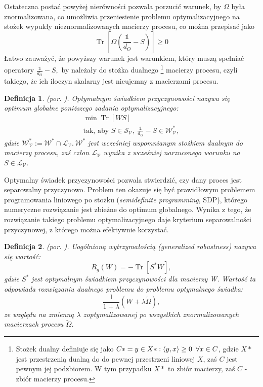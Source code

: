 \documentclass[10pt]{article} %
\newtheorem{definicja}{Definicja}
\DeclareMathOperator{\Trs}{Tr}
\newcommand{\I}{\mathbb{1}}
\begin{document}
Ostateczna postać powyżej nierówności pozwala porzucić warunek, by $\Omega$ była znormalizowana, co umożliwia przeniesienie problemu optymalizacyjnego na stożek wypukły nieznormalizowanych macierzy procesu, co można przepisać jako 
\begin{equation}
\Trs \left[ \Omega(\frac{\I}{d_O} -S) \right] \geq 0
\end{equation}
Łatwo zauważyć, że powyższy warunek jest warunkiem, który muszą spełniać operatory $\frac{\I}{d_O} - S,$ by należały do stożka dualnego
\footnote{
Stożek dualny definiuje się jako $C* = {y \in X*: \langle y, x \rangle \geq 0 \enskip \forall x \in C}$, gdzie $X*$ jest przestrzenią dualną do do pewnej przestrzeni liniowej $X$, zaś $C$ jest pewnym jej podzbiorem. W tym przypadku $X*$ to zbiór macierzy, zaś $C$ - zbiór macierzy procesu.
}
 macierzy procesu, czyli takiego, że ich iloczyn skalarny jest nieujemny z macierzami procesu.
\begin{definicja}
(por. \cite{causal_witness}).
Optymalnym świadkiem przyczynowości nazywa się optimum globalne poniższego zadania optymalizacyjnego:
\begin{gather}
\min \Trs \left[ WS \right]\\
\text{tak, aby } S \in \mathcal{S_V},~ \frac{\I}{d_O} - S \in \mathcal{W^*_V},
\end{gather}
gdzie $\mathcal{W^*_V}:=\mathcal{W^*} \cap \mathcal{L_V}.~ \mathcal{W^*}$ jest wcześniej wspomnianym stożkiem dualnym do macierzy procesu,
zaś człon $\mathcal{L_V}$ wynika z wcześniej narzuconego warunku na $S \in \mathcal{L_V}$. 
\end{definicja}
Optymalny świadek przyczynowości pozwala stwierdzić, czy dany proces jest separowalny przyczynowo.
Problem ten okazuje się być prawidłowym problemem
programowania liniowego po stożku (\textit{semidefinite programming}, SDP), którego numeryczne rozwiązanie jest zbieżne do optimum globalnego.
Wynika z tego, że rozwiązanie takiego problemu optymalizacyjnego daje kryterium separowalności przyczynowej, z którego można efektywnie korzystać.
\begin{definicja}
(por. \cite{causal_witness}).
Uogólnioną wytrzymałością (\textit{generalized robustness}) nazywa się wartość:
\begin{equation}
R_g(W) = -\Trs\left[ S^*W\right],
\end{equation} gdzie $S^*$ jest optymalnym świadkiem przyczynowości dla macierzy W. Wartość ta odpowiada rozwiązaniu dualnego problemu do problemu optymalnego świadka:
\begin{equation}
\frac{1}{1 + \lambda}\left( W + \lambda\widetilde{\Omega}\right),
\end{equation} ze względu na zmienną $\lambda$
zoptymalizowanej po wszystkich znormalizowanych macierzach procesu $\widetilde{\Omega}$. 
\end{definicja} 
\end{document}
